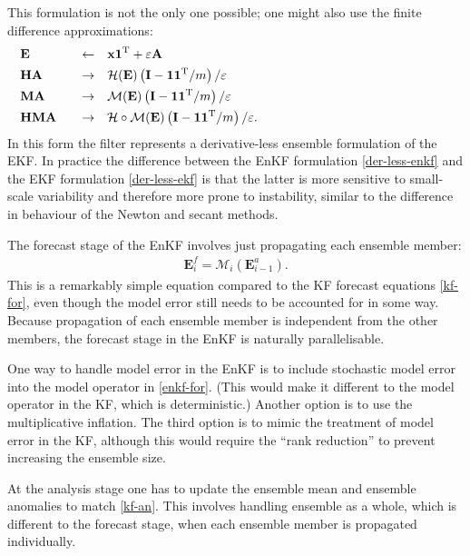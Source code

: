 \documentclass[11pt]{report}
\newcommand{\mb} {\mathbf}
\newcommand{\T}{^{\tiny \mathrm T}}
\begin{document}
This formulation is not the only one possible; one might also use the finite difference approximations:
\begin{subequations}
  \label{der-less-ekf}
  \begin{align}
    &\mb E \quad &\leftarrow& \quad \mb x \mb 1 \T  + \varepsilon \mb A \hspace{8cm}\\
    &\mb H \mb A \quad &\to& \quad \mathcal H(\mb E)\left(\mb I - \mb 1 \mb 1\T / m\right) / \varepsilon\\
    &\mb M \mb A \quad &\to& \quad \mathcal M(\mb E)\left(\mb I - \mb 1 \mb 1\T / m\right) / \varepsilon\\
    &\mb H \mb M \mb A \quad &\to& \quad \mathcal H \circ \mathcal M(\mb E)\left(\mb I - \mb 1 \mb 1\T / m\right) / \varepsilon.
  \end{align}
\end{subequations}
In this form the filter represents a derivative-less ensemble formulation of the EKF.
In practice the difference between the EnKF formulation \eqref{der-less-enkf} and the EKF formulation \eqref{der-less-ekf} is that the latter is more sensitive to small-scale variability and therefore more prone to instability, similar to the difference in behaviour of the Newton and secant methods.

The forecast stage of the EnKF involves just propagating each ensemble member:
\begin{align}
  \label{enkf-for}
  \mb E_i^f = \mathcal M_i(\mb E_{i-1}^a).
\end{align}
This is a remarkably simple equation compared to the KF forecast equations \eqref{kf-for}, even though the model error still needs to be accounted for in some way.
Because propagation of each ensemble member is independent from the other members, the forecast stage in the EnKF is naturally parallelisable.

One way to handle model error in the EnKF is to include stochastic model error into the model operator in \eqref{enkf-for}.
(This would make it different to the model operator in the KF, which is deterministic.)
Another option is to use the multiplicative inflation.
The third option is to mimic the treatment of model error in the KF, although this would require the ``rank reduction'' \citep[eq. 28]{ver97a} to prevent increasing the ensemble size.

At the analysis stage one has to update the ensemble mean and ensemble anomalies to match \eqref{kf-an}.
This involves handling ensemble as a whole, which is different to the forecast stage, when each ensemble member is propagated individually.
\end{document}
